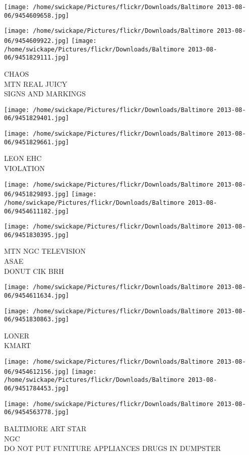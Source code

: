 \documentclass[10pt,letterpaper]{article}
\begin{document}
\texttt{[image: /home/swickape/Pictures/flickr/Downloads/Baltimore 2013-08-06/9454609658.jpg]}

\vspace{0.25in}
\texttt{[image: /home/swickape/Pictures/flickr/Downloads/Baltimore 2013-08-06/9454609922.jpg]}
\texttt{[image: /home/swickape/Pictures/flickr/Downloads/Baltimore 2013-08-06/9451829111.jpg]}

CHAOS\\
MTN REAL JUICY\\
SIGNS AND MARKINGS\\
\pagebreak

\texttt{[image: /home/swickape/Pictures/flickr/Downloads/Baltimore 2013-08-06/9451829401.jpg]}

\vspace{0.25in}
\texttt{[image: /home/swickape/Pictures/flickr/Downloads/Baltimore 2013-08-06/9451829661.jpg]}

LEON EHC\\
VIOLATION\\
\pagebreak

\texttt{[image: /home/swickape/Pictures/flickr/Downloads/Baltimore 2013-08-06/9451829893.jpg]}
\texttt{[image: /home/swickape/Pictures/flickr/Downloads/Baltimore 2013-08-06/9454611182.jpg]}

\texttt{[image: /home/swickape/Pictures/flickr/Downloads/Baltimore 2013-08-06/9451830395.jpg]}

MTN NGC TELEVISION\\
ASAE\\
DONUT CIK BRH\\
\pagebreak

\texttt{[image: /home/swickape/Pictures/flickr/Downloads/Baltimore 2013-08-06/9454611634.jpg]}

\vspace{0.25in}
\texttt{[image: /home/swickape/Pictures/flickr/Downloads/Baltimore 2013-08-06/9451830863.jpg]}

LONER\\
KMART\\
\pagebreak

\texttt{[image: /home/swickape/Pictures/flickr/Downloads/Baltimore 2013-08-06/9454612156.jpg]}
\texttt{[image: /home/swickape/Pictures/flickr/Downloads/Baltimore 2013-08-06/9451784453.jpg]}

\vspace{0.25in}
\texttt{[image: /home/swickape/Pictures/flickr/Downloads/Baltimore 2013-08-06/9454563778.jpg]}

BALTIMORE ART STAR\\
NGC\\
DO NOT PUT FUNITURE APPLIANCES DRUGS IN DUMPSTER\\
\pagebreak
\end{document}
